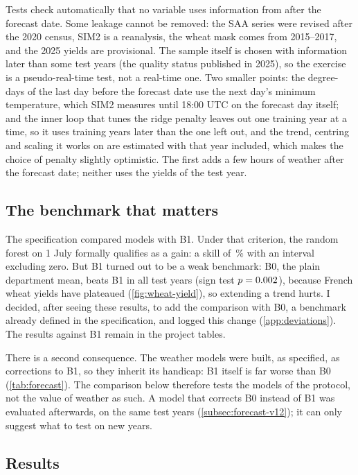 Tests check automatically that no variable uses information from after the forecast date. Some leakage cannot be removed: the SAA series were revised after the 2020 census, SIM2 is a reanalysis, the wheat mask comes from 2015--2017, and the 2025 yields are provisional. The sample itself is chosen with information later than some test years (the quality status published in 2025), so the exercise is a pseudo-real-time test, not a real-time one. Two smaller points: the degree-days of the last day before the forecast date use the next day's minimum temperature, which SIM2 measures until 18:00 UTC on the forecast day itself; and the inner loop that tunes the ridge penalty leaves out one training year at a time, so it uses training years later than the one left out, and the trend, centring and scaling it works on are estimated with that year included, which makes the choice of penalty slightly optimistic. The first adds a few hours of weather after the forecast date; neither uses the yields of the test year.

\subsection{The benchmark that matters}

The specification compared models with B1. Under that criterion, the random forest on 1 July formally qualifies as a gain: a skill of \RfVsBoneSkill\,\% with an interval excluding zero. But B1 turned out to be a weak benchmark: B0, the plain department mean, beats B1 in all \BzeroBeatsBone{} test years (sign test $p = 0.002$), because French wheat yields have plateaued (\cref{fig:wheat-yield}), so extending a trend hurts. I decided, after seeing these results, to add the comparison with B0, a benchmark already defined in the specification, and logged this change (\cref{app:deviations}). The results against B1 remain in the project tables.

There is a second consequence. The weather models were built, as specified, as corrections to B1, so they inherit its handicap: B1 itself is far worse than B0 (\cref{tab:forecast}). The comparison below therefore tests the models of the protocol, not the value of weather as such. A model that corrects B0 instead of B1 was evaluated afterwards, on the same test years (\cref{subsec:forecast-v12}); it can only suggest what to test on new years.

\subsection{Results}

